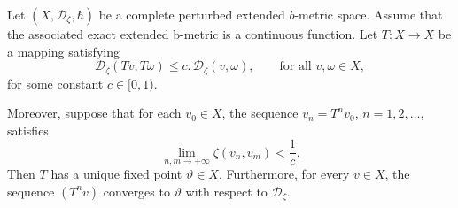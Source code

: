 \documentclass[10pt,a4paper]{amsart}
\begin{document}
\begin{theorem}\label{3.1} 
Let $(X,\mathcal{D}_{\zeta},\hbar)$ be a complete perturbed extended $b$-metric space. Assume that the associated exact extended b-metric is a continuous function. Let $T : X \to X$ be a mapping satisfying
\begin{equation}
\mathcal{D}_{\zeta}(T v,T \omega) 
\le c.\, \mathcal{D}_{\zeta}(v,\omega),
\qquad \text{for all } v,\omega \in X,
\end{equation}
for some constant $c \in [0,1)$. 

Moreover, suppose that for each $v_{0} \in X$, the sequence 
$v_{n} = T^{n}v_{0}$, $n = 1,2,\dots$, satisfies
\[
\lim_{n,m \to +\infty} \zeta(v_{n},v_{m}) < \frac{1}{c}.
\]
Then $T$ has a unique fixed point $\vartheta \in X$. Furthermore, for every 
$v \in X$, the sequence $(T^{n}v)$ converges to $\vartheta$ with respect to $\mathcal{D}_{\zeta}$.
\end{theorem}
\end{document}
